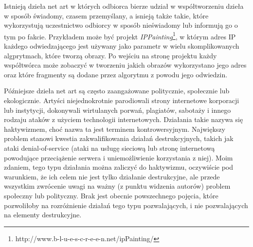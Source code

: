 \documentclass[a4paper,12pt,twoside]{article}
\begin{document}
Istnieją dzieła net art w których odbiorca bierze udział w współtworzeniu
dzieła w sposób świadomy, czasem przemyślany, a isnieją także takie,
które wykorzystują uczestnictwo odbiorcy w sposób nieświadomy lub informują
go o tym po fakcie. Przykładem może być projekt
\textit{IPPainting}\footnote{http://www.b-l-u-e-s-c-r-e-e-n.net/ipPainting/},
w którym adres IP każdego odwiedzającego jest używany jako parametr w wielu
skomplikowanych algprytmach, które tworzą obrazy. Po wejściu na stronę
projektu każdy współtwórca może zobaczyć w tworzeniu jakich obrazów
wykorzystano jego adres oraz które fragmenty są dodane przez algorytmu
z powodu jego odwiedzin.

Późniejsze dzieła net art są często zaangażowane politycznie, społecznie
lub ekologicznie. Artyści niejednokrotnie parodiowali strony internetowe
korporacji lub instytycji, dokonywali wirtulanych porwań, plagiatów,
sabotaży i innego rodzaju ataków z użyciem technologii internetowych.
Działania takie nazywa się haktywizmem, choć nazwa ta jest terminem
kontrowersyjnym. Największy problem stanowi kwestia zakwalifikowania
działań destrukcyjnych, takich jak ataki denial-of-service (ataki
na usługę sieciową lub stronę internetową powodujące przeciążenie
serwera i uniemożliwienie korzystania z niej). Moim zdaniem, tego typu
działania można zaliczyć do haktywizmu, oczywiście pod warunkiem, że ich
celem nie jest tylko działanie destrukcyjne, ale przede wszystkim zwrócenie
uwagi na ważny (z punktu widzenia autorów) problem społeczny lub polityczny.
Brak jest obecnie powszechnego pojęcia, które pozwoliłoby na rozróżnienie
działań tego typu pozwalających, i nie pozwalających na elementy destrukcyjne.
\end{document}
